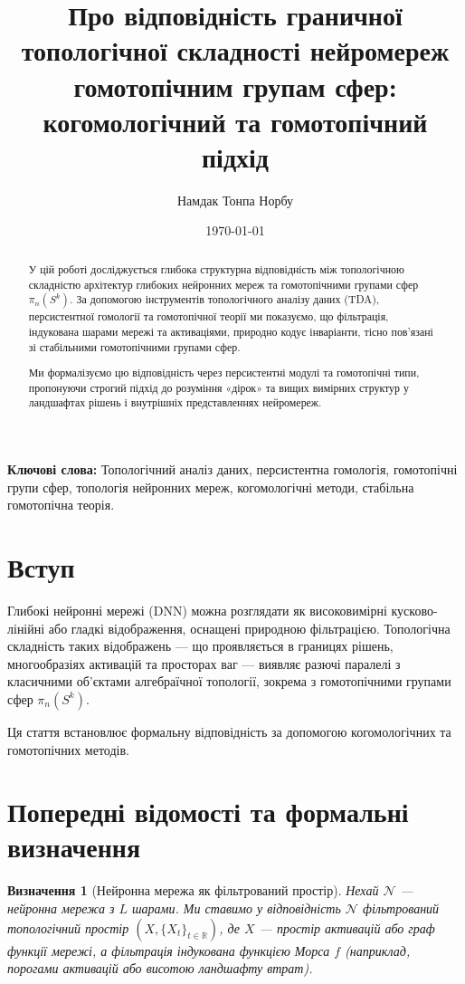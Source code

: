 \documentclass{article}
\title{Про відповідність граничної топологічної складності нейромереж гомотопічним групам сфер: когомологічний та гомотопічний підхід}
\author{Намдак Тонпа Норбу}
\date{\today}
\newtheorem{definition}{Визначення}
\begin{document}
\maketitle

\begin{abstract}
У цій роботі досліджується глибока структурна відповідність між топологічною складністю архітектур глибоких нейронних мереж та гомотопічними групами сфер $\pi_n(S^k)$. За допомогою інструментів топологічного аналізу даних (TDA), персистентної гомології та гомотопічної теорії ми показуємо, що фільтрація, індукована шарами мережі та активаціями, природно кодує інваріанти, тісно пов’язані зі стабільними гомотопічними групами сфер. 

Ми формалізуємо цю відповідність через персистентні модулі та гомотопічні типи, пропонуючи строгий підхід до розуміння «дірок» та вищих вимірних структур у ландшафтах рішень і внутрішніх представленнях нейромереж.
\end{abstract}

\textbf{Ключові слова:} Топологічний аналіз даних, персистентна гомологія, гомотопічні групи сфер, топологія нейронних мереж, когомологічні методи, стабільна гомотопічна теорія.

\section{Вступ}

Глибокі нейронні мережі (DNN) можна розглядати як високовимірні кусково-лінійні або гладкі відображення, оснащені природною фільтрацією. Топологічна складність таких відображень — що проявляється в границях рішень, многообразіях активацій та просторах ваг — виявляє разючі паралелі з класичними об’єктами алгебраїчної топології, зокрема з гомотопічними групами сфер $\pi_n(S^k)$.

Ця стаття встановлює формальну відповідність за допомогою когомологічних та гомотопічних методів.

\section{Попередні відомості та формальні визначення}

\begin{definition}[Нейронна мережа як фільтрований простір]
Нехай $\mathcal{N}$ — нейронна мережа з $L$ шарами. Ми ставимо у відповідність $\mathcal{N}$ фільтрований топологічний простір $(X, \{X_t\}_{t \in \mathbb{R}})$, де $X$ — простір активацій або граф функції мережі, а фільтрація індукована функцією Морса $f$ (наприклад, порогами активацій або висотою ландшафту втрат).
\end{definition}
\end{document}
